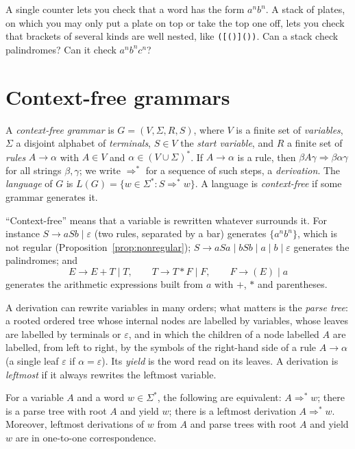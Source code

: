 \begin{think}
A single counter lets you check that a word has the form $a^nb^n$. A stack of plates, on which you may only put a plate on top or take the top one off, lets you check that brackets of several kinds are well nested, like \texttt{([()]())}. Can a stack check palindromes? Can it check $a^nb^nc^n$?
\end{think}

\section{Context-free grammars}\label{sec:cfg}

\begin{definition}\label{def:cfg}
A \emph{context-free grammar} is $G=(V,\Sigma,R,S)$, where $V$ is a finite set of \emph{variables}, $\Sigma$ a disjoint alphabet of \emph{terminals}, $S\in V$ the \emph{start variable}, and $R$ a finite set of \emph{rules} $A\to\alpha$ with $A\in V$ and $\alpha\in(V\cup\Sigma)^*$. If $A\to\alpha$ is a rule, then $\beta A\gamma\Rightarrow\beta\alpha\gamma$ for all strings $\beta,\gamma$; we write $\Rightarrow^*$ for a sequence of such steps, a \emph{derivation}. The \emph{language} of $G$ is $L(G)=\{w\in\Sigma^*:S\Rightarrow^*w\}$. A language is \emph{context-free} if some grammar generates it.
\end{definition}

``Context-free'' means that a variable is rewritten whatever surrounds it. For instance $S\to aSb\mid\varepsilon$ (two rules, separated by a bar) generates $\{a^nb^n\}$, which is not regular (Proposition~\ref{prop:nonregular}); $S\to aSa\mid bSb\mid a\mid b\mid\varepsilon$ generates the palindromes; and
\[
E\to E+T\mid T,\qquad T\to T*F\mid F,\qquad F\to(E)\mid a
\]
generates the arithmetic expressions built from $a$ with $+$, $*$ and parentheses.

A derivation can rewrite variables in many orders; what matters is the \emph{parse tree}: a rooted ordered tree whose internal nodes are labelled by variables, whose leaves are labelled by terminals or $\varepsilon$, and in which the children of a node labelled $A$ are labelled, from left to right, by the symbols of the right-hand side of a rule $A\to\alpha$ (a single leaf $\varepsilon$ if $\alpha=\varepsilon$). Its \emph{yield} is the word read on its leaves. A derivation is \emph{leftmost} if it always rewrites the leftmost variable.

\begin{proposition}\label{prop:parsetree}
For a variable $A$ and a word $w\in\Sigma^*$, the following are equivalent: $A\Rightarrow^*w$; there is a parse tree with root $A$ and yield $w$; there is a leftmost derivation $A\Rightarrow^*w$. Moreover, leftmost derivations of $w$ from $A$ and parse trees with root $A$ and yield $w$ are in one-to-one correspondence.
\end{proposition}

